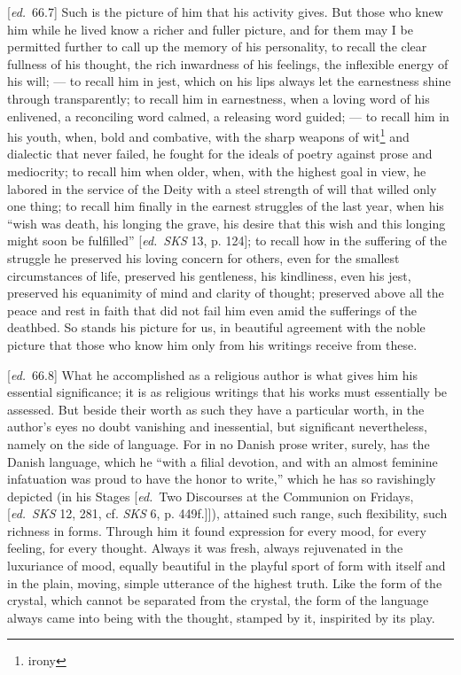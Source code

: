\documentclass[12pt,a4paper,openany]{book}
\newcommand{\kpage}[1]{\marginnote{\footnotesize\textit{[#1]}}}
\newcommand{\ed}[1]{{\small[\textit{ed.}\ #1]}}
\begin{document}
\ed{66.7} Such is the picture of him that his activity gives. But those who
knew him while he lived know a richer and fuller picture, and for them may I be
permitted further to call up the memory of his personality, to recall the clear
fullness of his thought, the rich inwardness of his feelings, the inflexible
energy of his will; --- to recall him in jest, which on his lips always let the
earnestness shine through transparently; to recall him in earnestness, when a
loving word of his enlivened, a reconciling word calmed, a releasing word
guided; --- to recall him in his youth, when, bold and combative, with the sharp
weapons of wit\footnote[35]{irony} and dialectic that never\kpage{107} failed,
he fought for the ideals of poetry against prose and mediocrity; to recall him
when older, when, with the highest goal in view, he labored in the service of
the Deity with a steel strength of will that willed only one thing; to recall
him finally in the earnest struggles of the last year, when his ``wish was
death, his longing the grave, his desire that this wish and this longing might
soon be fulfilled'' \ed{\emph{SKS} 13, p. 124}; to recall how in the suffering
of the struggle he preserved his loving concern for others, even for the
smallest circumstances of life, preserved his gentleness, his kindliness, even
his jest, preserved his equanimity of mind and clarity of thought; preserved
above all the peace and rest in faith that did not fail him even amid the
sufferings of the deathbed. So stands his picture for us, in beautiful
agreement with the noble picture that those who know him only from his writings
receive from these.

\ed{66.8} What he accomplished as a religious author is what gives him his
essential significance; it is as religious writings that his works must
essentially be assessed. But beside their worth as such they have a particular
worth, in the author's eyes no doubt vanishing and inessential, but significant
nevertheless, namely on the side of language. For in no Danish prose writer,
surely, has the Danish language, which he ``with a filial devotion, and with an
almost feminine infatuation was proud to have the honor to write,'' which he has
so ravishingly depicted (in his Stages \ed{Two Discourses at the Communion on
Fridays, \ed{\emph{SKS} 12, 281, cf. \emph{SKS} 6, p. 449f.}}), attained such
range, such flexibility, such richness in forms. Through him it found expression
for every mood, for every feeling, for every thought. Always it was fresh,
always rejuvenated in the luxuriance of mood, equally beautiful in the playful
sport of form with itself and in the plain, moving, simple utterance of the
highest truth. Like the form of the crystal, which cannot be separated from the
crystal, the form of the language always came into being with the thought,
stamped by it, inspirited by its play.
\end{document}
